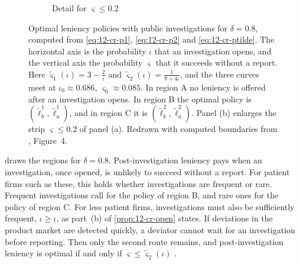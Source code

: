 \begin{figure}[htbp]
\begin{subfigure}[t]{0.49\textwidth}
\caption{Detail for $\varsigma \le 0.2$}\label{fig:12-leniency-regions-b}
\end{subfigure}
\caption{Optimal leniency policies with public investigations for $\delta = 0.8$, computed from
\eqref{eq:12-cr-p1}, \eqref{eq:12-cr-p2} and \eqref{eq:12-cr-ptilde}. The horizontal axis is the probability $\iota$
that an investigation opens, and the vertical axis the probability $\varsigma$ that it succeeds without a report.
Here $\tilde\varsigma_1(\iota) = 3 - \frac{2}{\iota}$ and $\tilde\varsigma_2(\iota) = \frac{1}{9 + 4\iota}$, and the
three curves meet at $\iota_0 \approx 0.686$, $\varsigma_0 \approx 0.085$. In region A no leniency is offered after an
investigation opens. In region B the optimal policy is $(\tilde\ell_b^1, \tilde\ell_a^1)$, and in region C it is
$(\tilde\ell_b^2, \tilde\ell_a^2)$. Panel (b) enlarges the strip $\varsigma \le 0.2$ of panel (a). Redrawn with
computed boundaries from \citet{ChenRey2013}, Figure~4.}
\label{fig:12-leniency-regions}
\end{figure}

 draws the regions for $\delta = 0.8$. Post-investigation leniency pays when an
investigation, once opened, is unlikely to succeed without a report. For patient firms such as these, this holds
whether investigations are frequent or rare. Frequent investigations call for the policy of region B, and rare ones
for the policy of region C. For less patient firms, investigations must also be sufficiently frequent,
$\iota \ge \underline\iota$, as part~(b) of \cref{prop:12-cr-open} states. If deviations in the product market are detected quickly, a
deviator cannot wait for an investigation before reporting. Then only the second route remains, and
post-investigation leniency is optimal if and only if $\varsigma \le \tilde\varsigma_2(\iota)$
\citep[footnote~26]{ChenRey2013}.

